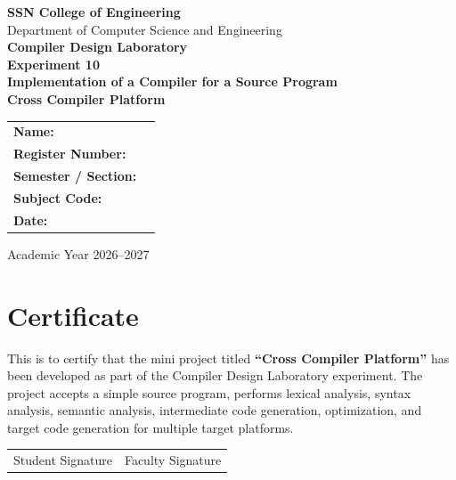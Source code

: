 \documentclass[12pt,a4paper]{report}
\begin{document}
\begin{titlepage}
    \centering
    \vspace*{0.5cm}
    {\Large \textbf{SSN College of Engineering}}\\[0.3cm]
    {\large Department of Computer Science and Engineering}\\[1.2cm]

    {\Large \textbf{Compiler Design Laboratory}}\\[0.4cm]
    {\large \textbf{Experiment 10}}\\[1.2cm]

    {\LARGE \textbf{Implementation of a Compiler for a Source Program}}\\[0.3cm]
    {\Large \textbf{Cross Compiler Platform}}\\[1.4cm]

    \begin{tabular}{>{\bfseries}l l}
        Name: & \underline{\hspace{7cm}}\\[0.35cm]
        Register Number: & \underline{\hspace{7cm}}\\[0.35cm]
        Semester / Section: & \underline{\hspace{7cm}}\\[0.35cm]
        Subject Code: & \underline{\hspace{7cm}}\\[0.35cm]
        Date: & \underline{\hspace{7cm}}\\
    \end{tabular}

    \vfill
    {\large Academic Year 2026--2027}
\end{titlepage}

\chapter*{Certificate}
This is to certify that the mini project titled \textbf{``Cross Compiler Platform''} has been developed as part of the Compiler Design Laboratory experiment. The project accepts a simple source program, performs lexical analysis, syntax analysis, semantic analysis, intermediate code generation, optimization, and target code generation for multiple target platforms.

\vspace{2cm}
\begin{tabular}{p{} p{}}
    \centering Student Signature & \centering Faculty Signature
\end{tabular}
\end{document}
